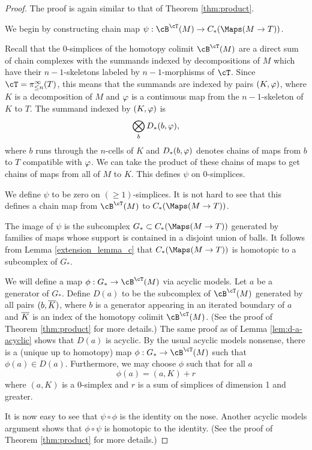 \begin{proof}
The proof is again similar to that of Theorem \ref{thm:product}.

We begin by constructing chain map $\psi: \cB^\cT(M) \to C_*(\Maps(M\to T))$.

Recall that 
the 0-simplices of the homotopy colimit $\cB^\cT(M)$ 
are a direct sum of chain complexes with the summands indexed by
decompositions of $M$ which have their $n{-}1$-skeletons labeled by $n{-}1$-morphisms
of $\cT$.
Since $\cT = \pi^\infty_{\leq n}(T)$, this means that the summands are indexed by pairs
$(K, \varphi)$, where $K$ is a decomposition of $M$ and $\varphi$ is a continuous
map from the $n{-}1$-skeleton of $K$ to $T$.
The summand indexed by $(K, \varphi)$ is
\[
	\bigotimes_b D_*(b, \varphi),
\]
where $b$ runs through the $n$-cells of $K$ and $D_*(b, \varphi)$ denotes
chains of maps from $b$ to $T$ compatible with $\varphi$.
We can take the product of these chains of maps to get chains of maps from
all of $M$ to $K$.
This defines $\psi$ on 0-simplices.

We define $\psi$ to be zero on $(\ge1)$-simplices.
It is not hard to see that this defines a chain map from 
$\cB^\cT(M)$ to $C_*(\Maps(M\to T))$.

The image of $\psi$ is the subcomplex $G_*\sub C_*(\Maps(M\to T))$ generated by 
families of maps whose support is contained in a disjoint union of balls.
It follows from Lemma \ref{extension_lemma_c} 
that $C_*(\Maps(M\to T))$ is homotopic to a subcomplex of $G_*$.

We will define a map $\phi:G_*\to \cB^\cT(M)$ via acyclic models.
Let $a$ be a generator of $G_*$.
Define $D(a)$ to be the subcomplex of $\cB^\cT(M)$ generated by all 
pairs $(b, \overline{K})$, where $b$ is a generator appearing in an iterated boundary of $a$
and $\overline{K}$ is an index of the homotopy colimit $\cB^\cT(M)$.
(See the proof of Theorem \ref{thm:product} for more details.)
The same proof as of Lemma \ref{lem:d-a-acyclic} shows that $D(a)$ is acyclic.
By the usual acyclic models nonsense, there is a (unique up to homotopy)
map $\phi:G_*\to \cB^\cT(M)$ such that $\phi(a)\in D(a)$.
Furthermore, we may choose $\phi$ such that for all $a$ 
\[
	\phi(a) = (a, K) + r
\]
where $(a, K)$ is a 0-simplex and $r$ is a sum of simplices of dimension 1 and greater.

It is now easy to see that $\psi\circ\phi$ is the identity on the nose.
Another acyclic models argument shows that $\phi\circ\psi$ is homotopic to the identity.
(See the proof of Theorem \ref{thm:product} for more details.)
\end{proof}




